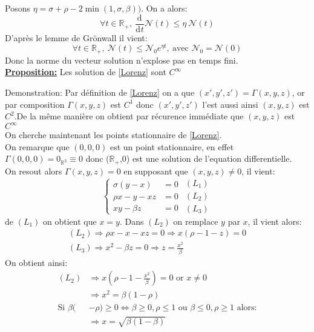 \documentclass{article}
\newcommand{\R}{\mathbb{R}}
\newcommand{\deriv}[3][ ]{
    \ensuremath{\frac{\mathrm{d}^{#1}#2}{\mathrm{d}^{#1} #3}}
}
\begin{document}
Posons $ \eta = \sigma + \rho - 2 \min (1,\sigma,\beta))$. On a alors: 
\[
    \forall t \in \R_+, \  \deriv{}{t}\mathcal{N}(t) \le \eta\  \mathcal{N}(t)
\]
D'après le lemme de Grönwall il vient:
\[
    \forall t \in \R_+,\  \mathcal{N}(t) \le \mathcal{N}_0 e^{\eta t},\  \textrm{avec } \mathcal{N}_0 = \mathcal{N}(0)
\]
Donc la norme du vecteur solution n'explose pas en temps fini.\\

\underline{\textbf{Proposition:}} Les solution de \eqref{Lorenz} sont $C^\infty$

Demonstration:
 Par définition de \eqref{Lorenz} on a que $(x',y',z') = \Gamma(x,y,z)$, or par composition $\Gamma(x,y,z)$ est $C^1$ donc $(x',y',z')$ l'est aussi ainsi $(x,y,z)$ est $C^2$.De la même manière on obtient par récurence immédiate que $(x,y,z)$ est $C^\infty$\\

On cherche maintenant les points stationnaire de \eqref{Lorenz}.\\
On remarque que $(0,0,0)$ est un point stationnaire, en effet $\Gamma(0,0,0) = 0_{\R^3} \equiv 0$ donc ($\R_+$,0) est une solution de l'equation differentielle.\\
On resout alors $\Gamma(x,y,z)=0$ en supposant que $(x,y,z) \neq 0$, il vient:
\[
\left\{\begin{array}{rl} %
     \sigma(y-x)&=0  \\
     \rho x -y -xz&=0\\
     xy - \beta z&=0
\end{array}\right.
\begin{array}{c} %
    (L_1)\\
    (L_2)\\
    (L_3)
\end{array}
\]
de $(L_1)$ on obtient que $x=y$. Dans $(L_2)$ on remplace $y$ par $x$, il vient alors:
\begin{gather*}
    (L_2) \Rightarrow \rho x - x - xz = 0 \Rightarrow x (\rho -1 -z ) = 0 \\
    (L_3) \Rightarrow x^2 - \beta z = 0 \Rightarrow z = \frac{x^2}{\beta}
\end{gather*}
On obtient ainsi:
\begin{align*}
    (L_2) & \Rightarrow x (\rho - 1 - \frac{x^2}{\beta}) = 0 \text{ or }x \neq 0\\
        & \Rightarrow x^2 = \beta (1-\rho)\\
    \text{Si } \beta(&-\rho) \ge 0 \Leftrightarrow \beta \ge 0,\rho\le 1 \text{ ou } \beta \le 0,\rho\ge 1\text{ alors:}\\
    &\Rightarrow x = \sqrt{\beta(1-\beta)}
\end{align*}
\end{document}
